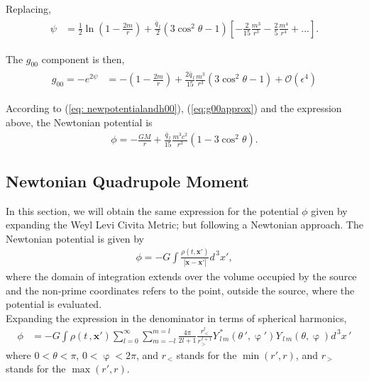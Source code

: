 Replacing,
\begin{align}
\begin{split}
	\psi &= \frac{1}{2}\ln\left(1-\frac{2m}{r}\right) + \frac{\bar{q}_{\, l}}{2}(3\cos^2\theta - 1) \left[-\frac{2}{15}\frac{m^3}{r^3}-\frac{2}{5}\frac{m^4}{r^4} + ...\right].
\end{split}
\end{align}

The $g_{00}$ component is then,
\begin{align}
\begin{split}
	g_{00} = -e^{2\psi} &= -\left(1-\frac{2m}{r}\right) + \frac{2\bar{q}_{\, l}}{15}\frac{m^3}{r^3}(3\cos^2\theta - 1)  + \mathcal{O}(\epsilon^4)
\end{split}
\end{align}

According to (\ref{eq: newpotentialandh00}), (\ref{eq:g00approx}) and the expression above, the Newtonian potential is
\begin{align}
\label{eq: potentialWLC}
	\phi = -\frac{GM}{r} +\frac{\bar{q}_{\, l}}{15}\frac{m^3 c^2}{r^3}(1-3\cos^2\theta ).
\end{align}

\subsection{Newtonian Quadrupole Moment}

In this section, we will obtain the same expression for the potential $\phi$  given by expanding the Weyl Levi Civita Metric; but following a Newtonian approach. The Newtonian potential is given by
\begin{align}
\phi = -G \int \frac{\rho(t, \mathbf{x'})}{|\mathbf{x} - \mathbf{x'}|} d^{\,3}x',
\end{align}
where the domain of integration extends over the volume occupied by the source and the non-prime coordinates refers to the point, outside the source, where the potential is evaluated.\\

Expanding the expression in the denominator in terms of spherical harmonics,
\begin{align*}
\phi &= -G \int \rho(t\,, \mathbf{x'}) \sum ^{\infty}_{l =0} \sum ^{m = l}_{m =-l} \frac{4\pi}{2l+1}\frac{r_{\, <}^{l}}{r_{\, >}^{\, l+1}} Y ^ {\,*}_{\,l\,m} (\theta \, ', \upvarphi') Y _{\,l\,m} (\theta, \upvarphi) d^{\,3}x\,'
\end{align*}
where $0<\theta<\pi$, $0<\upvarphi<2\pi$, and $r_{\, <}$ stands for the $\min(r', r)$, and $r_{\, >}$ stands for the $\max(r', r)$.\\

